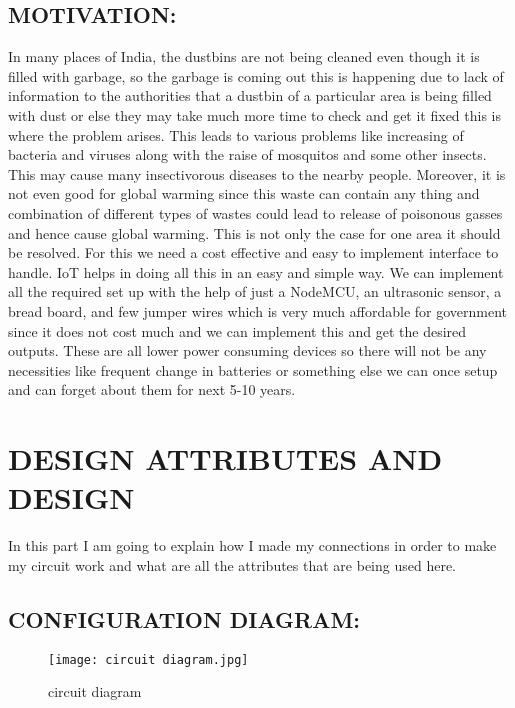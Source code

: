 \documentclass[12pt,letterpaper]{article}
\begin{document}
\subsection{MOTIVATION: }
In many places of India, the dustbins are not being cleaned even though it is filled with garbage, so the garbage is coming out this is happening due to lack of information to the authorities that a dustbin of a particular area is being filled with dust or else they may take much more time to check and get it fixed this is where the problem arises. This leads to various problems like increasing of bacteria and viruses along with the raise of mosquitos and some other insects. This may cause many insectivorous diseases to the nearby people. Moreover, it is not even good for global warming since this waste can contain any thing and combination of different types of wastes could lead to release of poisonous gasses and hence cause global warming.  This is not only the case for one area it should be resolved. For this we need a cost effective and easy to implement interface to handle. 
IoT helps in doing all this in an easy and simple way. We can implement all the required set up with the help of just a NodeMCU, an ultrasonic sensor, a bread board, and few jumper wires which is very much affordable for government since it does not cost much and we can implement this and get the desired outputs. These are all lower power consuming devices so there will not be any necessities like frequent change in batteries or something else we can once setup and can forget about them for next 5-10 years.




\newpage
\section{DESIGN ATTRIBUTES AND DESIGN}
In this part I am going to explain how I made my connections in order to make my circuit work and what are all the attributes that are being used here.
\subsection{CONFIGURATION DIAGRAM:}
\begin{figure}[htp]
        \centering
        \texttt{[image: circuit diagram.jpg]}
        \caption{circuit diagram }
        \label{fig:image3}
    \end{figure}
\end{document}
